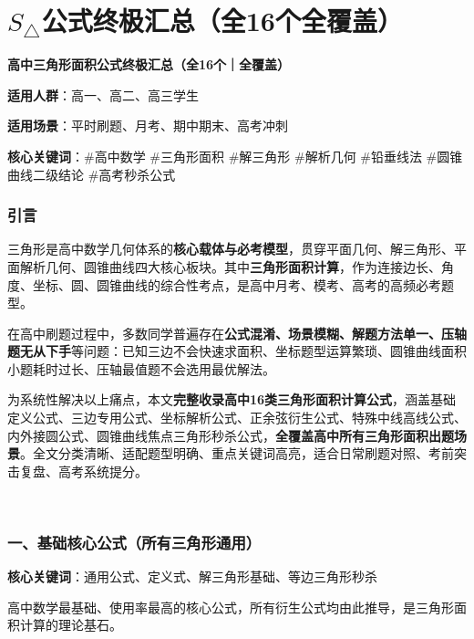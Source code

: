 \documentclass[10pt,CJKmath]{ctexart}
\begin{document}
\pagestyle{fancynotes}

\part{$S_{\triangle}$公式终极汇总（全16个全覆盖）}


\textbf{高中三角形面积公式终极汇总（全16个｜全覆盖）}

\textbf{适用人群}：高一、高二、高三学生

\textbf{适用场景}：平时刷题、月考、期中期末、高考冲刺

\textbf{核心关键词}：\#高中数学 \#三角形面积 \#解三角形 \#解析几何
\#铅垂线法 \#圆锥曲线二级结论 \#高考秒杀公式


\section*{引言}

三角形是高中数学几何体系的\textbf{核心载体与必考模型}，贯穿平面几何、解三角形、平面解析几何、圆锥曲线四大核心板块。其中\textbf{三角形面积计算}，作为连接边长、角度、坐标、圆、圆锥曲线的综合性考点，是高中月考、模考、高考的高频必考题型。

在高中刷题过程中，多数同学普遍存在\textbf{公式混淆、场景模糊、解题方法单一、压轴题无从下手}等问题：已知三边不会快速求面积、坐标题型运算繁琐、圆锥曲线面积小题耗时过长、压轴最值题不会选用最优解法。

为系统性解决以上痛点，本文\textbf{完整收录高中16类三角形面积计算公式}，涵盖基础定义公式、三边专用公式、坐标解析公式、正余弦衍生公式、特殊中线高线公式、内外接圆公式、圆锥曲线焦点三角形秒杀公式，\textbf{全覆盖高中所有三角形面积出题场景}。全文分类清晰、适配题型明确、重点关键词高亮，适合日常刷题对照、考前突击复盘、高考系统提分。

~

\section*{一、基础核心公式（所有三角形通用）}

\textbf{核心关键词}：通用公式、定义式、解三角形基础、等边三角形秒杀

高中数学最基础、使用率最高的核心公式，所有衍生公式均由此推导，是三角形面积计算的理论基石。
\end{document}
